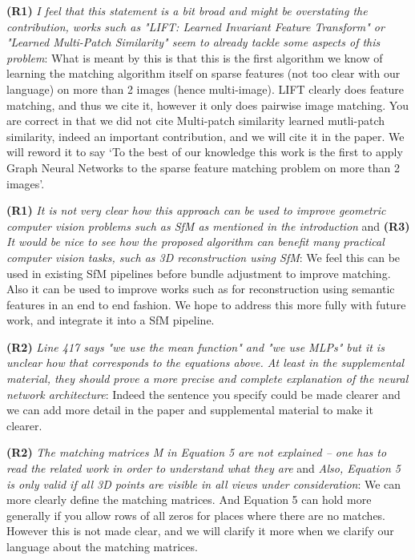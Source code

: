 \documentclass[10pt,twocolumn,letterpaper]{article}
\begin{document}
\textbf{(R1)} \textit{I feel that this statement is a bit broad and might be overstating the contribution, works such as "LIFT: Learned Invariant Feature Transform" or "Learned Multi-Patch Similarity" seem to already tackle some aspects of this problem}:
What is meant by this is that this is the first algorithm we know of learning the matching algorithm itself on sparse features (not too clear with our language) on more than 2 images (hence multi-image).
LIFT \cite{yi2016lift} clearly does feature matching, and thus we cite it, however it only does pairwise image matching.
You are correct in that we did not cite Multi-patch similarity \cite{hartmann2017learned} learned mutli-patch similarity, indeed an important contribution, and we will cite it in the paper.
We will reword it to say `To the best of our knowledge this work is the first to apply Graph Neural Networks to the sparse feature matching problem on more than 2 images'.

\textbf{(R1)} \textit{It is not very clear how this approach can be used to improve geometric computer vision problems such as SfM as mentioned in the introduction} and \textbf{(R3)} \textit{It would be nice to see how the proposed algorithm can benefit many practical computer vision tasks, such as 3D reconstruction using SfM}:
We feel this can be used in existing SfM pipelines before bundle adjustment to improve matching.
Also it can be used to improve works such as \cite{zhu2015single} for reconstruction using semantic features in an end to end fashion.
We hope to address this more fully with future work, and integrate it into a SfM pipeline.



\textbf{(R2)} \textit{Line 417 says "we use the mean function" and "we use MLPs" but it is unclear how that corresponds to the equations above. At least in the supplemental material, they should prove a more precise and complete explanation of the neural network architecture}:
Indeed the sentence you specify could be made clearer and we can add more detail in the paper and supplemental material to make it clearer.

\textbf{(R2)} \textit{The matching matrices M in Equation 5 are not explained -- one has to read the related work in order to understand what they are} and \textit{Also, Equation 5 is only valid if all 3D points are visible in all views under consideration}:
We can more clearly define the matching matrices.
And Equation 5 can hold more generally if you allow rows of all zeros for places where there are no matches.
However this is not made clear, and we will clarify it more when we clarify our language about the matching matrices.
\end{document}
